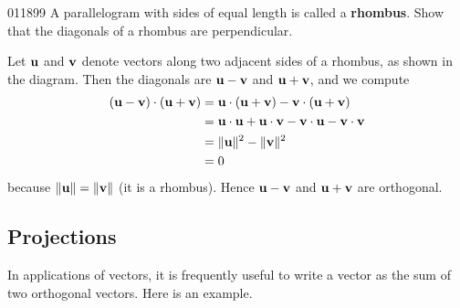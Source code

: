 \begin{example}{}{011899}
A parallelogram with sides of equal length is called a \textbf{rhombus}. Show that the diagonals of a rhombus are perpendicular.

\begin{wrapfigure}[6]{l}{5cm}
\centering

\end{wrapfigure}

\setlength{\rightskip}{0pt plus 200pt} 
\begin{solution}  Let $\textbf{u}$ and $\textbf{v}$ denote vectors along two adjacent sides of a rhombus, as shown in the diagram. Then the diagonals are $\textbf{u} - \textbf{v}$ and $\textbf{u} + \textbf{v}$, and we compute
\begin{align*}
(\textbf{u} - \textbf{v}) \cdot (\textbf{u} + \textbf{v}) &= \textbf{u} \cdot (\textbf{u} + \textbf{v}) - \textbf{v} \cdot (\textbf{u} + \textbf{v})\\
&= \textbf{u} \cdot \textbf{u} + \textbf{u} \cdot \textbf{v} - \textbf{v} \cdot \textbf{u} - \textbf{v} \cdot \textbf{v} \\
&= \| \textbf{u} \|^2 - \| \textbf{v} \|^2 \\
&= 0
\end{align*}
because $\|\textbf{u}\| = \|\textbf{v}\|$ (it is a rhombus). Hence $\textbf{u} - \textbf{v}$ and $\textbf{u} + \textbf{v}$ are orthogonal.

\end{solution}
\end{example}

\subsection*{Projections}


In applications of vectors, it is frequently useful to write a vector as the sum of two orthogonal vectors. Here is an example.


